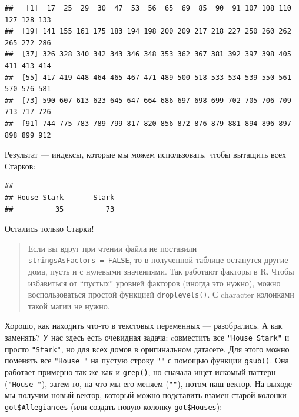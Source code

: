 \documentclass[]{book}
\newenvironment{Shaded}{\begin{snugshade}}{\end{snugshade}}
\newcommand{\KeywordTok}[1]{\textcolor[rgb]{0.13,0.29,0.53}{\textbf{#1}}}
\newcommand{\DataTypeTok}[1]{\textcolor[rgb]{0.13,0.29,0.53}{#1}}
\newcommand{\StringTok}[1]{\textcolor[rgb]{0.31,0.60,0.02}{#1}}
\newcommand{\OtherTok}[1]{\textcolor[rgb]{0.56,0.35,0.01}{#1}}
\newcommand{\OperatorTok}[1]{\textcolor[rgb]{0.81,0.36,0.00}{\textbf{#1}}}
\newcommand{\NormalTok}[1]{#1}
\begin{document}
\begin{Shaded}
\end{Shaded}

\begin{verbatim}
##   [1]  17  25  29  30  47  53  56  65  69  85  90  91 107 108 110 127 128 133
##  [19] 141 155 161 175 183 194 198 200 209 217 218 227 250 260 262 265 272 286
##  [37] 326 328 340 342 343 346 348 353 362 367 381 392 397 398 405 411 413 414
##  [55] 417 419 448 464 465 467 471 489 500 518 533 534 539 550 561 570 576 581
##  [73] 590 607 613 623 645 647 664 686 697 698 699 702 705 706 709 713 717 726
##  [91] 744 775 783 789 799 817 820 856 872 876 879 881 894 896 897 898 899 912
\end{verbatim}

Результат --- индексы, которые мы можем использовать, чтобы вытащить
всех Старков:

\begin{Shaded}
\end{Shaded}

\begin{verbatim}
## 
## House Stark       Stark 
##          35          73
\end{verbatim}

Остались только Старки!

\begin{quote}
Если вы вдруг при чтении файла не поставили
\texttt{stringsAsFactors\ =\ FALSE}, то в полученной таблице останутся
другие дома, пусть и с нулевыми значениями. Так работают факторы в R.
Чтобы избавиться от ``пустых'' уровней факторов (иногда это нужно),
можно воспользоваться простой функцией \texttt{droplevels()}. С
character колонками такой магии не нужно.
\end{quote}

Хорошо, как находить что-то в текстовых переменных --- разобрались. А
как заменять? У нас здесь есть очевидная задача: cовместить все
\texttt{"House\ Stark"} и просто \texttt{"Stark"}, но для всех домов в
оригинальном датасете. Для этого можно поменять все \texttt{"House\ "}
на пустую строку \texttt{""} с помощью функции \texttt{gsub()}. Она
работает примерно так же как и \texttt{grep()}, но сначала ищет искомый
паттерн (\texttt{"House\ "}), затем то, на что мы его меняем
(\texttt{""}), потом наш вектор. На выходе мы получим новый вектор,
который можно подставить взамен старой колонки \texttt{got\$Allegiances}
(или создать новую колонку \texttt{got\$Houses}):
\end{document}
